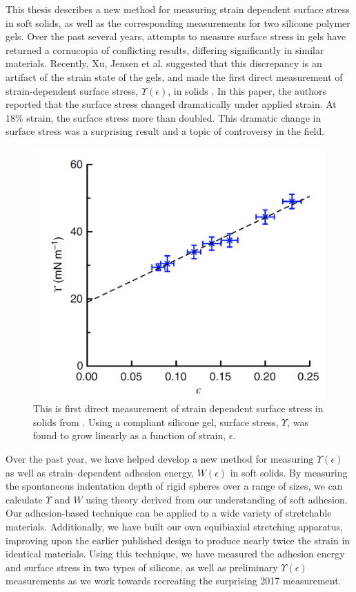 This thesis describes a new method for measuring strain dependent surface stress in soft solids, as well as the corresponding measurements for two silicone polymer gels. Over the past several years, attempts to measure surface stress in gels have returned a cornucopia of conflicting results, differing significantly in similar materials. Recently, Xu, Jensen et al. suggested that this discrepancy is an artifact of the strain state of the gels, and made the first direct measurement of strain-dependent surface stress, $\Upsilon(\epsilon)$, in solids \cite{xu2017direct}. In this paper, the authors reported that the surface stress changed dramatically under applied strain. At 18\% strain, the surface stress more than doubled. This dramatic change in surface stress was a surprising result and a topic of controversy in the field. 
\begin{figure}[h!]
	\centering
	\includegraphics[width=0.69\linewidth]{Chapters/Figures/2017natcomfig}
	\caption[Surface Stress vs. Strain in Silicone]{This is first direct measurement of strain dependent surface stress in solids from \cite{xu2017direct}. Using a compliant silicone gel, surface stress, $\Upsilon$, was found to grow linearly as a function of strain, $ \epsilon $.}
	\label{fig:2017natcomfig}
\end{figure}

Over the past year, we have helped develop a new method for measuring $\Upsilon(\epsilon)$ as well as strain--dependent adhesion energy, $ W(\epsilon) $ in soft solids. By measuring the spontaneous indentation depth of rigid spheres over a range of sizes, we can calculate $ \Upsilon $ and $ W $ using theory derived from our understanding of soft adhesion. Our adhesion-based technique can be applied to a wide variety of stretchable materials. Additionally, we have built our own equibiaxial stretching apparatus, improving upon the earlier published design \cite{xu2017direct} to produce nearly twice the strain in identical materials. Using this technique, we have measured the adhesion energy and surface stress in two types of silicone, as well as preliminary $ \Upsilon(\epsilon) $ measurements as we work towards recreating the surprising 2017 measurement.

